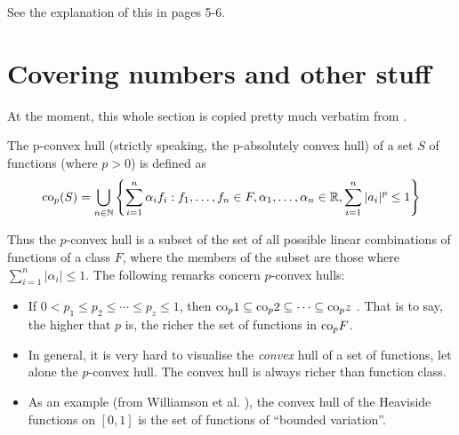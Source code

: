 See the explanation of this in \cite{Bartlett98a} pages 5-6.



\section{Covering numbers and other stuff}
At the moment, this whole section is copied pretty much verbatim from
\cite{Williamson99}.

The p-convex hull (strictly speaking, the p-absolutely convex hull) of
a set $S$ of functions (where $p>0$) is defined as
%
\begin{equation}
\mathrm{co}_p (S) =
 \bigcup _{n \in \mathbb{N}}
\left\{
 \sum_{i=1}^{n}
 \alpha _i
f_i : f_1, \ldots, f_n \in F,
 \alpha _1, \ldots, \alpha _n \in \mathbb{R},
 \sum_{i=1}^{n} | a_i |^p \leq 1
\right\}
\end{equation}

Thus the $p$-convex hull is a subset of the set of all possible linear
combinations of functions of a class $F$, where the members of the
subset are those where $\sum_{i=1}^n |\alpha_i| \leq 1$.  The
following remarks concern $p$-convex hulls:
%
\begin{itemize}
\item	If $0 < p_1 \leq p_2 \leq \cdots \leq p_z \leq 1$, then
	$\mathrm{co}_p 1 \subseteq \mathrm{co}_p 2 \subseteq \cdots \subseteq \mathrm{co}_p z$
	.  That is to say, the
	higher that $p$ is, the richer the set of functions in
	$\mathrm{co}_p{F}$.
\item	In general, it is very hard to visualise the \emph{convex} hull
	of a set of functions, let alone the $p$-convex hull.  The
	convex hull is always richer than function class.
\item	As an example (from Williamson et al. \cite{Williamson99}), the convex
	hull of the Heaviside functions on $[0, 1]$ is the set of
	functions of ``bounded variation''.
\end{itemize}










